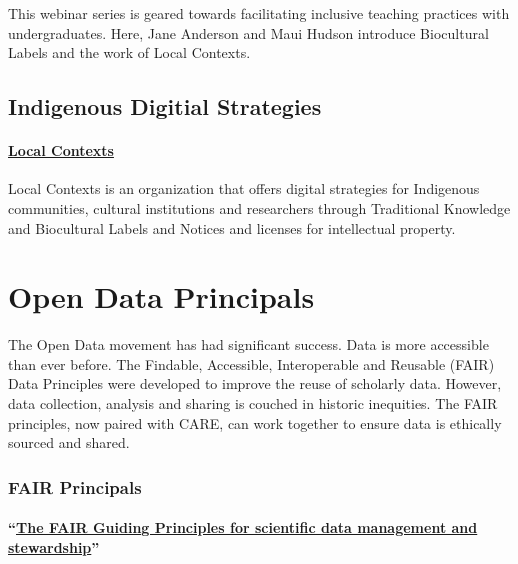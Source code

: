 \documentclass[
]{book}
\begin{document}
This webinar series is geared towards facilitating inclusive teaching practices with undergraduates. Here, Jane Anderson and Maui Hudson introduce Biocultural Labels and the work of Local Contexts.

\hypertarget{indigenous-digitial-strategies}{%
\section{Indigenous Digitial Strategies}\label{indigenous-digitial-strategies}}

\hypertarget{local-contexts}{%
\subsubsection*{\texorpdfstring{\href{https://localcontexts.org/labels/biocultural-labels/}{Local Contexts}}{Local Contexts}}\label{local-contexts}}

Local Contexts is an organization that offers digital strategies for Indigenous communities, cultural institutions and researchers through Traditional Knowledge and Biocultural Labels and Notices and licenses for intellectual property.

\hypertarget{open-data-principals}{%
\chapter{Open Data Principals}\label{open-data-principals}}

The Open Data movement has had significant success. Data is more accessible than ever before. The Findable, Accessible, Interoperable and Reusable (FAIR) Data Principles were developed to improve the reuse of scholarly data. However, data collection, analysis and sharing is couched in historic inequities. The FAIR principles, now paired with CARE, can work together to ensure data is ethically sourced and shared.

\hypertarget{fair-principals}{%
\subsection{FAIR Principals}\label{fair-principals}}

\hypertarget{the-fair-guiding-principles-for-scientific-data-management-and-stewardship}{%
\subsubsection*{\texorpdfstring{``\href{https://www.nature.com/articles/sdata201618}{The FAIR Guiding Principles for scientific data management and stewardship}''}{``The FAIR Guiding Principles for scientific data management and stewardship''}}\label{the-fair-guiding-principles-for-scientific-data-management-and-stewardship}}
\end{document}
